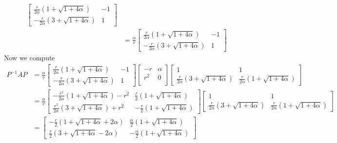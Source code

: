 \documentclass{article}
\begin{document}
\begin{solution}
\begin{align*}
\begin{bmatrix}
\frac{r}{2\alpha} \left( 1 + \sqrt{1 + 4\alpha}\right) & -1 \\
-\frac{r}{2\alpha} \left( 3 + \sqrt{1 + 4\alpha}\right) & 1
\end{bmatrix}\\
&= \frac{\alpha}{r}
\begin{bmatrix}
\frac{r}{2\alpha} \left( 1 + \sqrt{1 + 4\alpha}\right) & -1 \\
-\frac{r}{2\alpha} \left( 3 + \sqrt{1 + 4\alpha}\right) & 1
\end{bmatrix}
\end{align*}
Now we compute
\begin{align*}
P^{-1}AP &= \frac{\alpha}{r}
\begin{bmatrix}
\frac{r}{2\alpha} \left( 1 + \sqrt{1 + 4\alpha}\right) & -1 \\
-\frac{r}{2\alpha} \left( 3 + \sqrt{1 + 4\alpha}\right) & 1
\end{bmatrix}
\begin{bmatrix}
-r	&	\alpha	\\
r^{2}	&	0	\\
\end{bmatrix}
\begin{bmatrix}
1 & 1 \\
\frac{r}{2\alpha} \left( 3 + \sqrt{1 + 4\alpha}\right)
&
\frac{r}{2\alpha} \left( 1 + \sqrt{1 + 4\alpha}\right)
\end{bmatrix}
\\
&= \frac{\alpha}{r}
\begin{bmatrix}
-\frac{r^{2}}{2\alpha} \left( 1 + \sqrt{1 + 4\alpha}\right)-r^{2} 
&
\frac{r}{2} \left( 1 + \sqrt{1 + 4\alpha}\right) 
\\
\frac{r^{2}}{2\alpha} \left( 3 + \sqrt{1 + 4\alpha}\right)+r^{2} 
&
-\frac{r}{2} \left( 1 + \sqrt{1 + 4\alpha}\right)
\end{bmatrix}
\begin{bmatrix}
1 & 1 \\
\frac{r}{2\alpha} \left( 3 + \sqrt{1 + 4\alpha}\right)
&
\frac{r}{2\alpha} \left( 1 + \sqrt{1 + 4\alpha}\right)
\end{bmatrix}
\\
&=
\begin{bmatrix}
-\frac{r}{2} \left( 1 + \sqrt{1 + 4\alpha} + 2\alpha \right) 
&
\frac{\alpha}{2} \left( 1 + \sqrt{1 + 4\alpha}\right) 
\\
\frac{r}{2} \left( 3 + \sqrt{1 + 4\alpha} - 2\alpha \right) 
&
-\frac{\alpha}{2} \left( 1 + \sqrt{1 + 4\alpha}\right)
\end{bmatrix}

\end{align*}
\end{solution}
\end{document}
